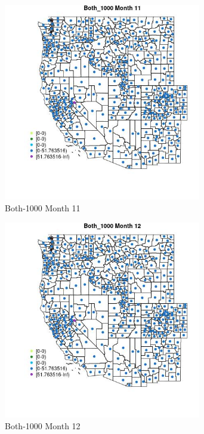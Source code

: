 \begin{figure} 
\centering  
\includegraphics[width=0.77\textwidth]{Code_Outputs/df_report_ML_predictors_CountyCentroid_Locations_Dates_2008-01-01to2018-12-31_MapObsMo11Both_1000.jpg} 
\caption{\label{fig:df_report_ML_predictors_CountyCentroid_Locations_Dates_2008-01-01to2018-12-31MapObsMo11Both_1000}Both-1000 Month 11} 
\end{figure} 
 

\begin{figure} 
\centering  
\includegraphics[width=0.77\textwidth]{Code_Outputs/df_report_ML_predictors_CountyCentroid_Locations_Dates_2008-01-01to2018-12-31_MapObsMo12Both_1000.jpg} 
\caption{\label{fig:df_report_ML_predictors_CountyCentroid_Locations_Dates_2008-01-01to2018-12-31MapObsMo12Both_1000}Both-1000 Month 12} 
\end{figure} 
 

